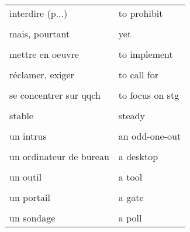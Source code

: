 \documentclass[
  10pt,
]{article}
\begin{document}
\begin{longtable}{ll}
interdire (p...) & to prohibit\\

\cellcolor{gray!6}{le siège d'une entreprise} & \cellcolor{gray!6}{the headquarters}\\

mais, pourtant & yet\\

\cellcolor{gray!6}{même si (concession)} & \cellcolor{gray!6}{even though}\\

mettre en oeuvre & to implement\\

\cellcolor{gray!6}{pendant que} & \cellcolor{gray!6}{while}\\

réclamer, exiger & to call for\\

\cellcolor{gray!6}{s'avérer} & \cellcolor{gray!6}{to turn out}\\

se concentrer sur qqch & to focus on stg\\

\cellcolor{gray!6}{s'empresser de} & \cellcolor{gray!6}{to rush to do stg}\\

stable & steady\\

\cellcolor{gray!6}{une politique, une mesure} & \cellcolor{gray!6}{a policy}\\

un intrus & an odd-one-out\\

\cellcolor{gray!6}{un noyau} & \cellcolor{gray!6}{a core}\\

un ordinateur de bureau & a desktop\\

\cellcolor{gray!6}{un ordinateur portable} & \cellcolor{gray!6}{a laptop}\\

un outil & a tool\\

\cellcolor{gray!6}{un pilier} & \cellcolor{gray!6}{a pillar}\\

un portail & a gate\\

\cellcolor{gray!6}{un résumé} & \cellcolor{gray!6}{a summary}\\

un sondage & a poll\\
\bottomrule
\end{longtable}
\end{document}
